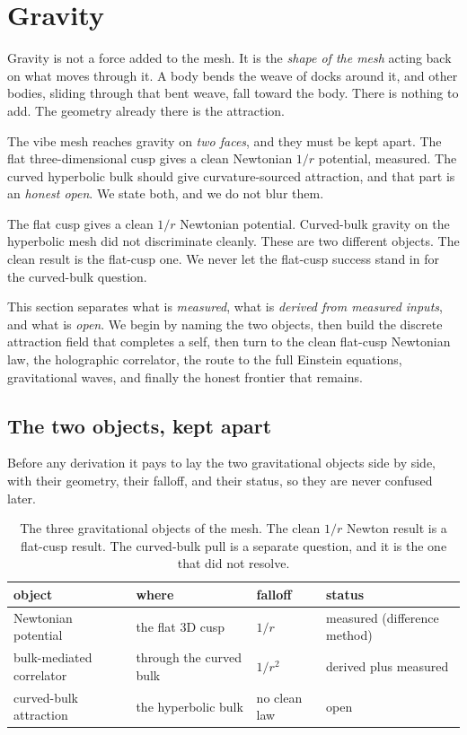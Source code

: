\section{Gravity}

Gravity is not a force added to the mesh. It is the \emph{shape of the mesh} acting back on what moves through it. A body bends the weave of docks around it, and other bodies, sliding through that bent weave, fall toward the body. There is nothing to add. The geometry already there is the attraction.

The vibe mesh reaches gravity on \emph{two faces}, and they must be kept apart. The flat three-dimensional cusp gives a clean Newtonian $1/r$ potential, measured. The curved hyperbolic bulk should give curvature-sourced attraction, and that part is an \emph{honest open}. We state both, and we do not blur them.

\begin{principle}
The flat cusp gives a clean $1/r$ Newtonian potential. Curved-bulk gravity on the hyperbolic mesh did not discriminate cleanly. These are two different objects. The clean result is the flat-cusp one. We never let the flat-cusp success stand in for the curved-bulk question.
\end{principle}

This section separates what is \emph{measured}, what is \emph{derived from measured inputs}, and what is \emph{open}. We begin by naming the two objects, then build the discrete attraction field that completes a self, then turn to the clean flat-cusp Newtonian law, the holographic correlator, the route to the full Einstein equations, gravitational waves, and finally the honest frontier that remains.

\subsection{The two objects, kept apart}

Before any derivation it pays to lay the two gravitational objects side by side, with their geometry, their falloff, and their status, so they are never confused later.

\begin{table}[ht]
\centering
\begin{tabular}{@{}llll@{}}
\toprule
object & where & falloff & status \\
\midrule
Newtonian potential & the flat 3D cusp & $1/r$ & measured (difference method) \\
bulk-mediated correlator & through the curved bulk & $1/r^2$ & derived plus measured \\
curved-bulk attraction & the hyperbolic bulk & no clean law & open \\
\bottomrule
\end{tabular}
\caption{The three gravitational objects of the mesh. The clean $1/r$ Newton result is a flat-cusp result. The curved-bulk pull is a separate question, and it is the one that did not resolve.}
\label{tab:gravity-objects}
\end{table}

